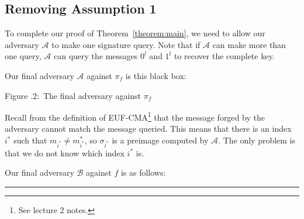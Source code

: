 \documentclass[twoside]{article}
\newcounter{lecnum}
\newcommand{\fig}[3]{
            \vspace{#2}
            \begin{center}
            Figure \thelecnum.#1:~#3
            \end{center}
    }
\newenvironment{proof}{{\bf Proof:}}{\hfill\rule{2mm}{2mm}}
\begin{document}
\subsection{Removing Assumption 1}

To complete our proof of Theorem~\ref{theorem:main}, we need to allow our adversary $\mathcal{A}$ to make one signature query. Note that if $\mathcal{A}$ can make more than one query, $\mathcal{A}$ can query the messages $0^l$ and $1^l$ to recover the complete key.

\begin{proof}
Our final adversary $\mathcal{A}$ against $\pi_f$ is this black box:

\begin{center}
\end{center}
\fig{2}{0in}{The final adversary against $\pi_f$}

Recall from the definition of EUF-CMA\footnote{See lecture 2 notes.} that the message forged by the adversary cannot match the message queried. This means that there is an index $i^*$ such that $m_{i^*} \neq m^*_{i^*}$, so $\sigma_{i^*}$ is a preimage computed by $\mathcal{A}$. The only problem is that we do not know which index $i^*$ is.

Our final adversary $\mathcal{B}$ against $f$ is as follows:


\end{proof}
\end{document}
